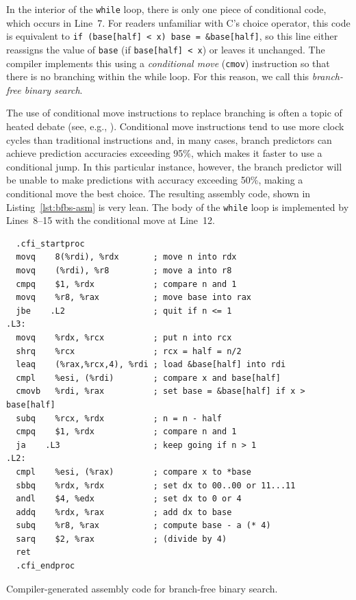 \documentclass{patmorin}
\newcommand{\lstlabel}[1]{\label{lst:#1}}
\newcommand{\lstref}[1]{Listing~\ref{lst:#1}}
\begin{document}
In the interior of the \texttt{while} loop, there is only one
piece of conditional code, which occurs in Line~7.  For readers unfamiliar
with C's choice operator, this code is equivalent to \texttt{if
(base[half] < x) base = &base[half]}, so this line either reassigns
the value of \texttt{base} (if \texttt{base[half]
< x}) or leaves it unchanged.  The compiler implements this using a
\emph{conditional move} (\texttt{cmov}) instruction so that
there is no branching within the while loop.  For this reason, we call
this \emph{branch-free binary search}.

The use of conditional move instructions to replace branching is often a
topic of heated debate (see, e.g., \cite{torvalds:cmov}).  Conditional
move instructions tend to use more clock cycles than traditional
instructions and, in many cases, branch predictors can achieve prediction
accuracies exceeding 95\%, which makes it faster to use a conditional
jump.  In this particular instance, however, the branch predictor will
be unable to make predictions with accuracy exceeding 50\%, making a
conditional move the best choice.  The resulting assembly code, shown in
\lstref{bfbs-asm} is very lean.  The body of the \texttt{while}
loop is implemented by Lines~8--15 with the conditional move at Line~12.


\begin{listing}
\begin{verbatim}
  .cfi_startproc
  movq    8(%rdi), %rdx       ; move n into rdx
  movq    (%rdi), %r8         ; move a into r8
  cmpq    $1, %rdx            ; compare n and 1
  movq    %r8, %rax           ; move base into rax
  jbe    .L2                  ; quit if n <= 1
.L3:
  movq    %rdx, %rcx          ; put n into rcx
  shrq    %rcx                ; rcx = half = n/2
  leaq    (%rax,%rcx,4), %rdi ; load &base[half] into rdi
  cmpl    %esi, (%rdi)        ; compare x and base[half]
  cmovb   %rdi, %rax          ; set base = &base[half] if x > base[half]
  subq    %rcx, %rdx          ; n = n - half
  cmpq    $1, %rdx            ; compare n and 1
  ja    .L3                   ; keep going if n > 1
.L2:
  cmpl    %esi, (%rax)        ; compare x to *base
  sbbq    %rdx, %rdx          ; set dx to 00..00 or 11...11
  andl    $4, %edx            ; set dx to 0 or 4 
  addq    %rdx, %rax          ; add dx to base
  subq    %r8, %rax           ; compute base - a (* 4)
  sarq    $2, %rax            ; (divide by 4)
  ret
  .cfi_endproc
\end{verbatim}
\caption{Compiler-generated assembly code for branch-free binary search.}
\lstlabel{bfbs-asm}
\end{listing}
\end{document}
